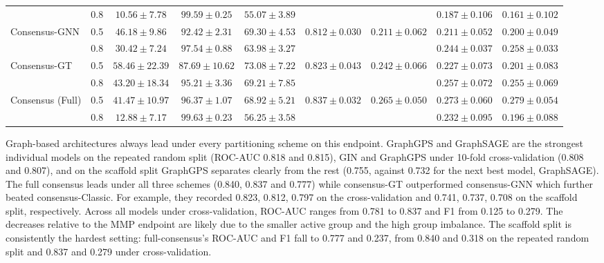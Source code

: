 \documentclass[letterpaper]{article}
\begin{document}
\begin{table}[htbp]
{\begin{tabular}{llccccccc}
 & 0.8 & $10.56 \pm 7.78$ & \underline{$99.59 \pm 0.25$} & $55.07 \pm 3.89$ &  &  & $0.187 \pm 0.106$ & $0.161 \pm 0.102$ \\
\multirow{2}{*}{Consensus-GNN} & 0.5 & $46.18 \pm 9.86$ & $92.42 \pm 2.31$ & $69.30 \pm 4.53$ & \multirow{2}{*}{$0.812 \pm 0.030$} & \multirow{2}{*}{$0.211 \pm 0.062$} & $0.211 \pm 0.052$ & $0.200 \pm 0.049$ \\
 & 0.8 & $30.42 \pm 7.24$ & $97.54 \pm 0.88$ & $63.98 \pm 3.27$ &  &  & $0.244 \pm 0.037$ & $0.258 \pm 0.033$ \\
\multirow{2}{*}{Consensus-GT} & 0.5 & $58.46 \pm 22.39$ & $87.69 \pm 10.62$ & \underline{$73.08 \pm 7.22$} & \multirow{2}{*}{\underline{$0.823 \pm 0.043$}} & \multirow{2}{*}{$0.242 \pm 0.066$} & $0.227 \pm 0.073$ & $0.201 \pm 0.083$ \\
 & 0.8 & $43.20 \pm 18.34$ & $95.21 \pm 3.36$ & $69.21 \pm 7.85$ &  &  & $0.257 \pm 0.072$ & $0.255 \pm 0.069$ \\
\multirow{2}{*}{Consensus (Full)} & 0.5 & $41.47 \pm 10.97$ & $96.37 \pm 1.07$ & $68.92 \pm 5.21$ & \multirow{2}{*}{{\boldmath$0.837 \pm 0.032$}} & \multirow{2}{*}{{\boldmath$0.265 \pm 0.050$}} & {\boldmath$0.273 \pm 0.060$} & {\boldmath$0.279 \pm 0.054$} \\
 & 0.8 & $12.88 \pm 7.17$ & {\boldmath$99.63 \pm 0.23$} & $56.25 \pm 3.58$ &  &  & $0.232 \pm 0.095$ & $0.196 \pm 0.088$ \\
\bottomrule
\end{tabular}%
}
\end{table}
\FloatBarrier
Graph-based architectures always lead under every partitioning scheme on this endpoint. GraphGPS and GraphSAGE are the strongest individual models on the repeated random split (ROC-AUC 0.818 and 0.815), GIN and GraphGPS under 10-fold
cross-validation (0.808 and 0.807), and on the scaffold split GraphGPS separates clearly from the rest (0.755, against 0.732 for the next best model, GraphSAGE). The full consensus leads under all three schemes (0.840, 0.837 and 0.777) while consensus-GT outperformed consensus-GNN which further beated consensus-Classic. For example, they recorded 0.823, 0.812, 0.797 on the cross-validation and 0.741, 0.737, 0.708 on the scaffold split, respectively. Across all models under cross-validation, ROC-AUC ranges from 0.781 to 0.837 and F1 from
0.125 to 0.279. The decreases relative to the MMP endpoint are likely due to the smaller active group and the high group imbalance. The scaffold split is consistently the hardest setting: full-consensus's ROC-AUC and F1 fall to 0.777 and 0.237, from 0.840 and 0.318 on the repeated random split and 0.837 and 0.279 under cross-validation.
\end{document}
